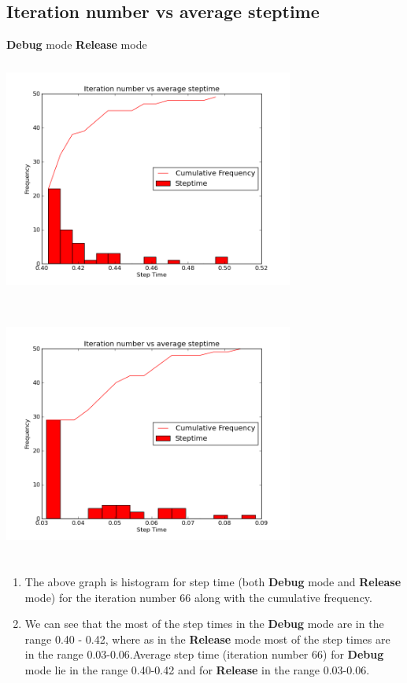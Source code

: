 \documentclass{article}
\begin{document}
\subsection{Iteration number vs average steptime}
\textbf{Debug} mode \hfill \textbf{Release} mode\\
\includegraphics[width=270pt,height=240pt]{g27_lab09_plot04_debug} \hfill  
\includegraphics[width=270pt,height=240pt]{g27_lab09_plot04_release}
\begin{enumerate}
\item The above graph is histogram for step time (both \textbf{Debug} mode and \textbf{Release} mode) for the iteration number 66  along with the cumulative frequency.\\
\item We can see that the most of the step times in the \textbf{Debug} mode are in the range 0.40 - 0.42, where as in the \textbf{Release} mode most of the step times are in the range 0.03-0.06.Average step time (iteration number 66)  for \textbf{Debug} mode lie in the range 0.40-0.42 and for \textbf{Release} in the range 0.03-0.06.
\end{enumerate}
\end{document}
